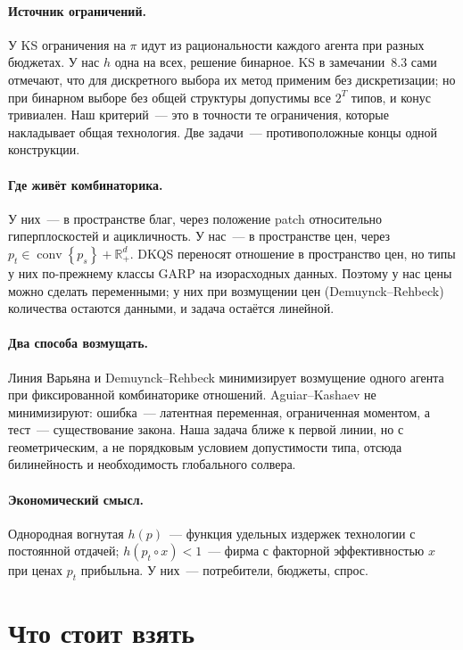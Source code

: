 \documentclass[a4paper,11pt]{article}
\theoremstyle{plain}
\theoremstyle{definition}
\theoremstyle{remark}
\newcommand{\R}{\mathbb{R}}
\newcommand{\set}[1]{\left\{ #1 \right\}}
\newcommand{\Rp}[1][2]{\R^{#1}_{+}}   %
\DeclareMathOperator{\conv}{conv}
\begin{document}
\paragraph{Источник ограничений.} У KS ограничения на $\pi$ идут из рациональности каждого агента при разных бюджетах. У нас $h$ одна на всех, решение бинарное. KS в замечании~8.3 сами отмечают, что для дискретного выбора их метод применим без дискретизации; но при бинарном выборе без общей структуры допустимы все $2^T$ типов, и конус тривиален. Наш критерий~--- это в точности те ограничения, которые накладывает общая технология. Две задачи~--- противоположные концы одной конструкции.

\paragraph{Где живёт комбинаторика.} У них~--- в пространстве благ, через положение patch относительно гиперплоскостей и ацикличность. У нас~--- в пространстве цен, через $p_t\in\conv\set{p_s}+\Rp[d]$. DKQS переносят отношение в пространство цен, но типы у них по-прежнему классы GARP на изорасходных данных. Поэтому у нас цены можно сделать переменными; у них при возмущении цен (Demuynck--Rehbeck) количества остаются данными, и задача остаётся линейной.

\paragraph{Два способа возмущать.} Линия Варьяна и Demuynck--Rehbeck минимизирует возмущение одного агента при фиксированной комбинаторике отношений. Aguiar--Kashaev не минимизируют: ошибка~--- латентная переменная, ограниченная моментом, а тест~--- существование закона. Наша задача ближе к первой линии, но с геометрическим, а не порядковым условием допустимости типа, отсюда билинейность и необходимость глобального солвера.

\paragraph{Экономический смысл.} Однородная вогнутая $h(p)$~--- функция удельных издержек технологии с постоянной отдачей; $h(p_t\circ x)<1$~--- фирма с факторной эффективностью $x$ при ценах $p_t$ прибыльна. У них~--- потребители, бюджеты, спрос.

\section{Что стоит взять}
\end{document}
